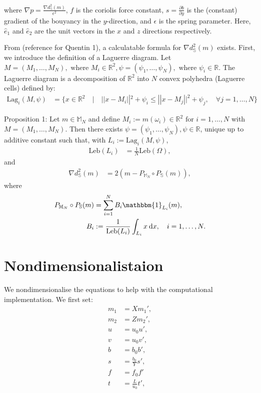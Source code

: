 \documentclass[11pt, oneside]{article}   	%
\newcommand{\R}{\mathbb{R}}
\newcommand{\MN}{\mathbb{M}_N}
\newcommand{\graddsmsq}{\nabla{d^{2}_{\mathbb{S}}(m)}}
\newcommand{\eone}{\hat{e}_1}
\newcommand{\etwo}{\hat{e}_2}
\newcommand{\Leb}{\mathrm{Leb}}
\begin{document}
where \(\nabla p = \frac{\graddsmsq}{\epsilon^2}\),  \(f\) is the coriolis force constant, \(s = \frac{\partial{b}}{\partial{y}}\) is the (constant) gradient of the bouyancy in the \(y\)-direction, and \(\epsilon\) is the spring parameter. Here, \(\eone\) and \(\etwo\) are the unit vectors in the \(x\) and \(z\) directions respectively.

From (reference for Quentin 1), a calculatable formula for \(\graddsmsq\) exists. First, we introduce the definition of a Laguerre diagram. Let \(M = (M_1,\dots,M_N), \text{ where } M_i \in \R^2, \psi = (\psi_1,\dots,\psi_N), \text{ where } \psi_i \in \R\). The Laguerre diagram is a decomposition of \(\R^2\) into \(N\) convex polyhedra (Laguerre cells) defined by:
\begin{align}
\mathrm{Lag}_i(M, \psi) &= \{x \in \R^2 \quad | \quad || x - M_i ||^2 + \psi_i \le || x - M_j ||^2 + \psi_j, \quad \forall j = 1,\dots,N\}
\end{align}

Proposition 1: Let \(m \in \MN\) and define \(M_i := m(\omega_i) \in \R^2 \text{ for } i = 1,\dots,N\) with \(M = (M_1,\dots,M_N)\). Then there exists \(\psi = (\psi_1,\dots,\psi_N), \psi \in \R\), unique up to additive constant such that, with \(L_i := \mathrm{Lag}_i(M, \psi)\), 
\begin{align}
\Leb(L_i) &= \frac{1}{N}\Leb(\Omega),
\end{align}
and
\begin{align}
\graddsmsq &= 2(m - P_{\MN} \circ P_{\mathbb{S}}(m)),
\end{align}
where
\begin{align}
P_{\MN} \circ P_{\mathbb{S}}(m) &= \sum^N_{i=1} B_i \mathbbm{1}_{L_i}(m), \\
B_i &:= \frac{1}{\Leb(L_i)} \int_{L_i} x \: \mathrm{d}x, \quad i = 1,\dots,N. 
\end{align}



\section{Nondimensionalistaion}

We nondimensionalise the equations to help with the computational implementation. We first set:
\begin{align} 
m_1 &= X m_1', \\
m_2 &= Z m_2', \\
u &= u_0 u', \\
v &=  u_0 v', \\
b &= b_0 b', \\
s &= \frac{b_0}{Y} s', \\
f &= f_0 f' \\
t &= \frac{L}{u_0} t',
\end{align}
\end{document}

